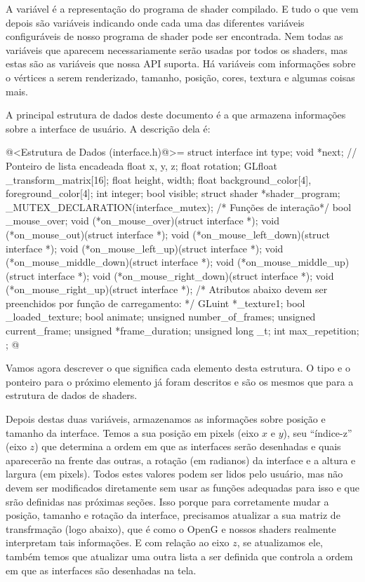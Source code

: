 A variável  é a representação do programa de
shader compilado. E tudo o que vem depois são variáveis indicando onde
cada uma das diferentes variáveis configuráveis de nosso programa de
shader pode ser encontrada. Nem todas as variáveis que aparecem
necessariamente serão usadas por todos os shaders, mas estas são as
variáveis que nossa API suporta. Há variáveis com informações sobre o
vértices a serem renderizado, tamanho, posição, cores, textura e
algumas coisas mais.


A principal estrutura de dados deste documento é a que armazena
informações sobre a interface de usuário. A descrição dela é:

\iniciocodigo
@<Estrutura de Dados (interface.h)@>=
struct interface{
  int type;
  void *next; // Ponteiro de lista encadeada
  float x, y, z;
  float rotation;
  GLfloat _transform_matrix[16];
  float height, width;
  float background_color[4], foreground_color[4];
  int integer;
  bool visible;
  struct shader *shader_program;
  _MUTEX_DECLARATION(interface_mutex);
  /* Funções de interação*/
  bool _mouse_over;
  void (*on_mouse_over)(struct interface *);
  void (*on_mouse_out)(struct interface *);
  void (*on_mouse_left_down)(struct interface *);
  void (*on_mouse_left_up)(struct interface *);
  void (*on_mouse_middle_down)(struct interface *);
  void (*on_mouse_middle_up)(struct interface *);
  void (*on_mouse_right_down)(struct interface *);
  void (*on_mouse_right_up)(struct interface *);
  /* Atributos abaixo devem ser preenchidos por função de carregamento: */
  GLuint *_texture1;
  bool _loaded_texture;
  bool animate;
  unsigned number_of_frames;
  unsigned current_frame;
  unsigned *frame_duration;
  unsigned long _t;
  int max_repetition;
};
@
\fimcodigo

Vamos agora descrever o que significa cada elemento desta estrutura. O
tipo e o ponteiro para o próximo elemento já foram descritos e são os
mesmos que para a estrutura de dados de shaders.

Depois destas duas variáveis, armazenamos as informações sobre posição
e tamanho da interface. Temos a sua posição em pixels (eixo $x$ e
$y$), seu ``índice-z'' (eixo $z$) que determina a ordem em que as
interfaces serão desenhadas e quais aparecerão na frente das outras, a
rotação (em radianos) da interface e a altura e largura (em
pixels). Todos estes valores podem ser lidos pelo usuário, mas não
devem ser modificados diretamente sem usar as funções adequadas para
isso e que srão definidas nas próximas seções. Isso porque para
corretamente mudar a posição, tamanho e rotação da interface,
precisamos atualizar a sua matriz de transfrmação (logo abaixo), que é
como o OpenG e nossos shaders realmente interpretam tais
informações. E com relação ao eixo $z$, se atualizamos ele, também
temos que atualizar uma outra lista a ser definida que controla a
ordem em que as interfaces são desenhadas na tela.

